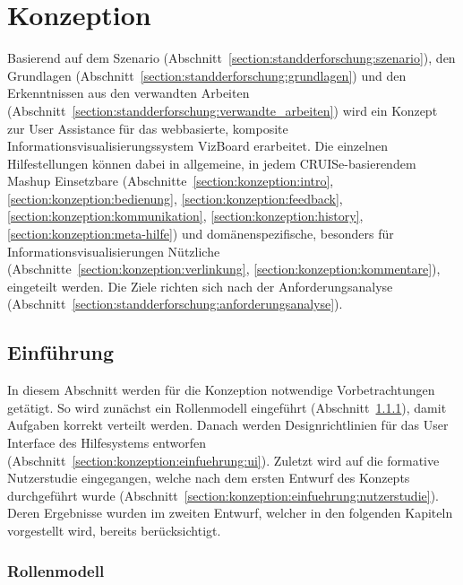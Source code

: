 \documentclass[
	headsepline,
	footsepline,
	fontsize=12pt,
	bibliography=totoc
]{scrbook}
\begin{document}
\chapter{Konzeption}
\label{chapter:konzeption}

Basierend auf dem Szenario (Abschnitt~\ref{section:standderforschung:szenario}), den Grundlagen (Abschnitt~\ref{section:standderforschung:grundlagen}) und den Erkenntnissen aus den verwandten Arbeiten (Abschnitt~\ref{section:standderforschung:verwandte_arbeiten}) wird ein Konzept zur User Assistance für das webbasierte, komposite Informationsvisualisierungssystem VizBoard erarbeitet. Die einzelnen Hilfestellungen können dabei in allgemeine, in jedem CRUISe-basierendem Mashup Einsetzbare (Abschnitte~\ref{section:konzeption:intro}, \ref{section:konzeption:bedienung}, \ref{section:konzeption:feedback}, \ref{section:konzeption:kommunikation}, \ref{section:konzeption:history}, \ref{section:konzeption:meta-hilfe}) und domänenspezifische, besonders für Informationsvisualisierungen Nützliche (Abschnitte~\ref{section:konzeption:verlinkung}, \ref{section:konzeption:kommentare}), eingeteilt werden. Die Ziele richten sich nach der Anforderungsanalyse (Abschnitt~\ref{section:standderforschung:anforderungsanalyse}).

\section{Einführung}
\label{section:konzeption:einfuehrung}

In diesem Abschnitt werden für die Konzeption notwendige Vorbetrachtungen getätigt. So wird zunächst ein Rollenmodell eingeführt (Abschnitt~\ref{section:konzeption:einfuehrung:rollenmodell}), damit Aufgaben korrekt verteilt werden. Danach werden Designrichtlinien für das User Interface des Hilfesystems entworfen (Abschnitt~\ref{section:konzeption:einfuehrung:ui}). Zuletzt wird auf die formative Nutzerstudie eingegangen, welche nach dem ersten Entwurf des Konzepts durchgeführt wurde (Abschnitt~\ref{section:konzeption:einfuehrung:nutzerstudie}). Deren Ergebnisse wurden im zweiten Entwurf, welcher in den folgenden Kapiteln vorgestellt wird, bereits berücksichtigt.

\subsection{Rollenmodell}
\label{section:konzeption:einfuehrung:rollenmodell}
\end{document}

